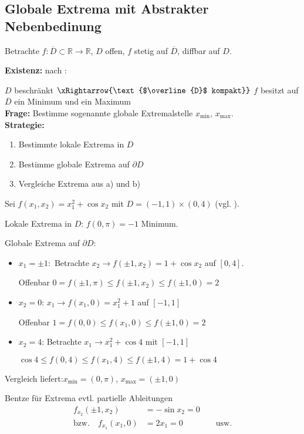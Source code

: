 \subsection{Globale Extrema mit Abstrakter Nebenbedinung}
Betrachte $f:\overline{D}\subset\mathbb{R}\to\mathbb{R}$, $D$ offen, $f$ stetig auf $\overline{D}$, \gls{diffbar} auf $D$.

\textbf{Existenz:} nach :
	
	$D$ beschränkt $\xRightarrow{\text{$\overline{D}$ kompakt}}$ $f$ besitzt auf $\overline{D}$ ein Minimum und ein Maximum\\

\textbf{Frage:} Bestimme sogenannte globale Extremalstelle $x_{\min}$, $x_{\max}$. \\

\textbf{Strategie:}\\
	\begin{enumerate}[label={\alph*)},topsep=\dimexpr-\baselineskip/2\relax]
		\item Bestimmte lokale Extrema in $D$
		\item Bestimme globale Extrema auf $\partial D$
		\item Vergleiche Extrema aus a) und b)
	\end{enumerate}

\begin{example}
	Sei $f(x_1, x_2) = x_1^2 + \cos x_2$ mit $D=(-1,1)\times(0,4)$ (vgl. ).
	
	Lokale Extrema in $D$: $f(0,\pi) = -1$ Minimum.
	
	Globale Extrema auf $\partial D$:\begin{itemize}
		\item $x_1 = \pm 1:$ Betrachte $x_2 \to f(\pm 1, x_2) = 1 + \cos x_2$ auf $[0,4]$.
		
		Offenbar $0 = f(\pm 1, \pi) \le f(\pm 1, x_2) \le f(\pm 1, 0) = 2$
		
		\item $x_2=0$: $x_1\to f(x_1, 0) = x_1^2 + 1$ auf $[-1,1]$
		
		Offenbar $1=f(0,0) \le f(x_1,0)\le f(\pm 1, 0) = 2$
		
		\item $x_2 = 4$: Betrachte $x_1\to x_1^2+\cos 4$ mit $[-1,1]$
		
		$\cos 4 \le f(0,4) \le f(x_1, 4) \le f(\pm 1, 4) = 1 + \cos 4$
	\end{itemize}
	Vergleich liefert:$ x_{\min}=(0,\pi)$, $x_{\max} = (\pm 1,0)$
	
	\begin{underlinedenvironment}[Hinweis]
		Bentze für Extrema evtl. partielle Ableitungen \begin{align*}
			f_{x_2}(\pm 1, x_2) &= -\sin x_2 = 0 \\
			\text{bzw.}\quad f_{x_1}(x_1, 0) &= 2x_1 = 0 \qquad\qquad\text{usw.}
		\end{align*}
	\end{underlinedenvironment}
\end{example}